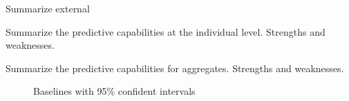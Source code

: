 \documentclass[12pt,letterpaper]{article}
\begin{document}



Summarize external

Summarize the predictive capabilities at the individual level.  Strengths and weaknesses.

Summarize the predictive capabilities for aggregates.  Strengths and weaknesses.
\begin{figure}[h!]
	\centering
	\caption{Baselines with 95\% confident intervals}
	\label{fig:basepred}
\end{figure}
\end{document}
